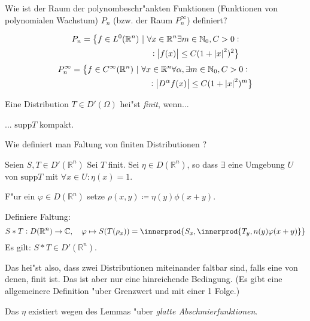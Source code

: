 \documentclass[9pt]{article}
\newcommand{\Rn}{\mathbb{R}^n}
\newcommand{\C}[1]{%
	\ifthenelse{\equal{#1}{}}
	{\mathbb{C}}
	{\mathbb{C}^{#1}}}%
\DeclarePairedDelimiter{\innerprod}\langle\rangle
\newenvironment{field}{}{\newpage}
\newif\ifnote
\newenvironment{note}{\notetrue}{\notefalse}
\newcommand{\localtag}{}
\newcommand{\globaltag}{}
\newcommand{\uuid}{}
\newcommand{\tags}[1]{
    \ifnote 
        \renewcommand{\localtag}{#1}
    \else
        \renewcommand{\globaltag}{#1}
    \fi 
    }
\newcommand{\xplain}[1]{\renewcommand{\uuid}{#1}}
\begin{document}
			\begin{note}
				\xplain{0e34d028-ac88-4c20-a15a-3b2eca92028c}
				\tags{}
				
				\begin{field}  %
					Wie ist der Raum der polynombeschr"ankten Funktionen (Funktionen von polynomialen Wachstum) $P_n$ (bzw. der Raum $P^\infty_n$) definiert?
				\end{field}
				
				\begin{field}  %
					 \begin{align*}
					 	P_n = \big\{f\in L^0(\Rn)\ | \ \forall x \in \Rn \exists m\in \mathbb{N}_0, C>0 :& \\ : \abs{f(x)} \leq C(1 + \abs{x}^2)^2\big\}&
					 \end{align*}
					 \begin{align*}
					 P_n^\infty = \big\{f\in C^\infty(\Rn)\ | \ \forall x \in \Rn \forall \alpha, \exists m\in \mathbb{N}_0, C>0 :& \\ : \abs{D^\alpha f(x)} \leq C(1 + \abs{x}^2)^m&\big\}
					 \end{align*}					
				\end{field}
			\end{note}
			\begin{note}
				\xplain{45e859a4-165d-4c5d-98dd-03e167ff0a38}
				\tags{}
				
				\begin{field}  %
					Eine Distribution $T\in D'(\Omega)$ hei"st \textit{finit}, wenn...
				\end{field}
				
				\begin{field}  %
					... $\text{supp}T$ kompakt.
				\end{field}
					
				\begin{field}  %
					Wie definiert man Faltung von finiten Distributionen ? 
				\end{field}
				
				\begin{field}  %
					Seien $S, T \in D'(\Rn)$ Sei $T$ finit. Sei $\eta \in D(\Rn)$, so dass $\exists$ eine Umgebung $U$ von $\text{supp}T$
					mit $\forall x \in U : \eta(x)=1$.
					
					F"ur ein $\varphi \in D(\Rn)$ setze $\rho(x,y) \coloneqq \eta(y)\phi(x+y)$.
					
					Definiere Faltung:
					\begin{equation*}
					 S * T : D(\Rn) \rightarrow \C{}, \quad \varphi \mapsto S(T(\rho_x))= \innerprod{S_x,\innerprod{T_y, n(y)\varphi(x+y)}}
					\end{equation*} 
					Es gilt: $S*T \in D'(\Rn)$.
					
					Das hei"st also, dass zwei Distributionen miteinander faltbar sind, falls eine von denen, finit ist. Das ist aber nur eine hinreichende Bedingung. (Es gibt eine allgemeinere Definition "uber Grenzwert und mit einer 1 Folge.) 
					
					Das $\eta$ existiert wegen des Lemmas "uber \textit{glatte Abschmierfunktionen}.
				\end{field}
			\end{note}
\end{document}
